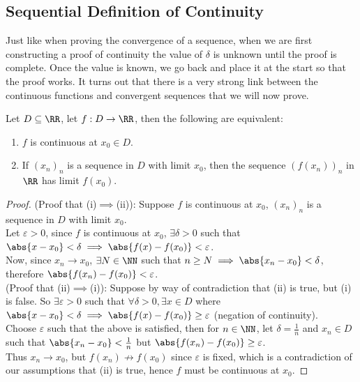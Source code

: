 \documentclass[../real_analysis.tex]{subfiles}
\begin{document}
        \subsection{Sequential Definition of Continuity}\label{subsec:sequential-definition-of-continuity}
            Just like when proving the convergence of a sequence, when we are first constructing a proof of continuity the value of $\delta$ is unknown until the proof is complete. Once the value is known, we go back and place it at the start so that the proof works.
            It turns out that there is a very strong link between the continuous functions and convergent sequences that we will now prove.
            \begin{theorem}\label{thm:seq-cont}
                Let $D\subseteq\RR$, let $f: D\to\RR$, then the following are equivalent:
                \begin{enumerate}[label={\upshape(\roman*)}]
                    \item $f$ is continuous at $x_0\in D$.
                    \item If $(x_n)_n$ is a sequence in $D$ with limit $x_0$, then the sequence $(f(x_n))_n$ in $\RR$ has limit $f(x_0)$.
                \end{enumerate}
            \end{theorem}
            \begin{proof}
                (Proof that (i)$\implies$(ii)): Suppose $f$ is continuous at $x_0$, $(x_n)_n$ is a sequence in $D$ with limit $x_0$.\\
                Let $\varepsilon>0$, since $f$ is continuous at $x_0$, $\exists\delta>0$ such that $\abs{x-x_0}<\delta\implies\abs{f(x)-f(x_0)}<\varepsilon$.\\
                Now, since $x_n\to x_0$, $\exists N\in\NN$ such that $n\geq N\implies\abs{x_n-x_0}<\delta$, therefore $\abs{f(x_n)-f(x_0)}<\varepsilon$.\\
                (Proof that (ii)$\implies$(i)): Suppose by way of contradiction that (ii) is true, but (i) is false. So $\exists\varepsilon>0$ such that $\forall\delta>0, \exists x\in D$ where $\abs{x-x_0}<\delta\implies\abs{f(x)-f(x_0)}\geq\varepsilon$ (negation of continuity).\\
                Choose $\varepsilon$ such that the above is satisfied, then for $n\in\NN$, let $\delta=\frac{1}{n}$ and $x_n\in D$ such that $\abs{x_n-x_0}<\frac{1}{n}$ but $\abs{f(x_n)-f(x_0)}\geq\varepsilon$.\\
                Thus $x_n\to x_0$, but $f(x_n)\not\to f(x_0)$ since $\varepsilon$ is fixed, which is a contradiction of our assumptions that (ii) is true, hence $f$ must be continuous at $x_0$.
            \end{proof}
\end{document}

